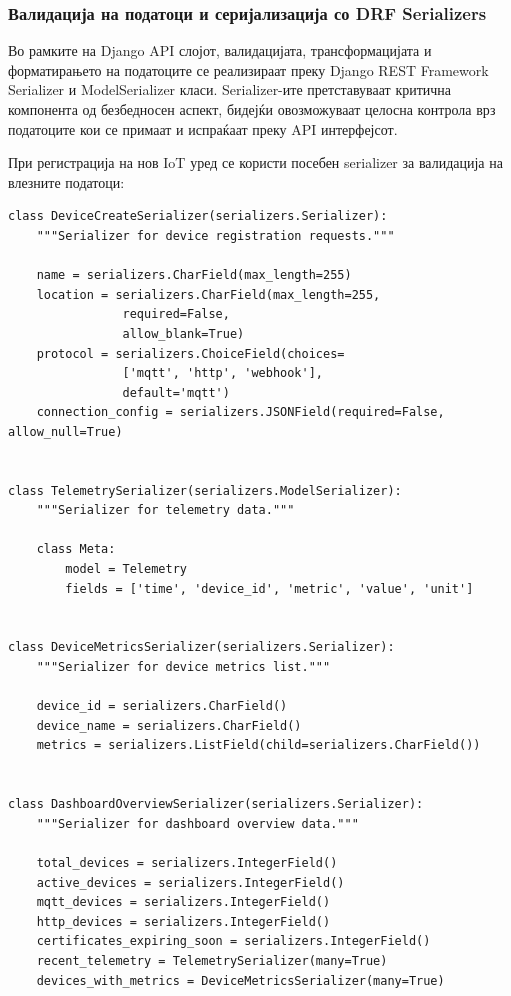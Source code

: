 \subsubsection{Валидација на податоци и серијализација со DRF Serializers}

Во рамките на Django API слојот, валидацијата, трансформацијата и
форматирањето на податоците се реализираат преку Django REST Framework
Serializer и ModelSerializer класи. Serializer-ите претставуваат
критична компонента од безбедносен аспект, бидејќи овозможуваат целосна
контрола врз податоците кои се примаат и испраќаат преку API
интерфејсот.

При регистрација на нов IoT уред се користи посебен serializer за
валидација на влезните податоци:

\begin{verbatim}
class DeviceCreateSerializer(serializers.Serializer):
    """Serializer for device registration requests."""
    
    name = serializers.CharField(max_length=255)
    location = serializers.CharField(max_length=255,
                required=False,
                allow_blank=True)
    protocol = serializers.ChoiceField(choices=
                ['mqtt', 'http', 'webhook'],
                default='mqtt')
    connection_config = serializers.JSONField(required=False, allow_null=True)


class TelemetrySerializer(serializers.ModelSerializer):
    """Serializer for telemetry data."""
    
    class Meta:
        model = Telemetry
        fields = ['time', 'device_id', 'metric', 'value', 'unit']


class DeviceMetricsSerializer(serializers.Serializer):
    """Serializer for device metrics list."""
    
    device_id = serializers.CharField()
    device_name = serializers.CharField()
    metrics = serializers.ListField(child=serializers.CharField())


class DashboardOverviewSerializer(serializers.Serializer):
    """Serializer for dashboard overview data."""
    
    total_devices = serializers.IntegerField()
    active_devices = serializers.IntegerField()
    mqtt_devices = serializers.IntegerField()
    http_devices = serializers.IntegerField()
    certificates_expiring_soon = serializers.IntegerField()
    recent_telemetry = TelemetrySerializer(many=True)
    devices_with_metrics = DeviceMetricsSerializer(many=True)
\end{verbatim}



